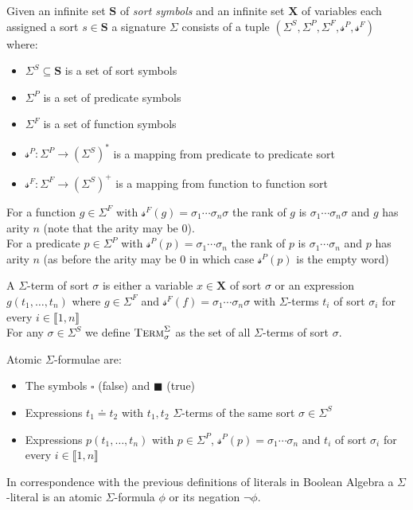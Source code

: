 \begin{definition}[Signature]
Given an infinite set $\mathbf{S}$ of \textit{sort symbols} and an infinite set $\mathbf{X}$ of variables each assigned a sort $s\in\mathbf{S}$ a signature $\Sigma$ consists of a tuple $\left(\Sigma^S, \Sigma^P, \Sigma^F, \mathcal{s}^P, \mathcal{s}^F \right)$ where:
\begin{itemize}
    \item $\Sigma^S \subseteq \mathbf{S}$ is a set of sort symbols
    \item $\Sigma^P$ is a set of predicate symbols
    \item $\Sigma^F$ is a set of function symbols
    \item $\mathcal{s}^P\colon \Sigma^P \to \left(\Sigma^S\right)^\ast$ is a mapping from predicate to predicate sort
    \item $\mathcal{s}^F\colon \Sigma^F \to \left(\Sigma^S\right)^+$ is a mapping from function to function sort
\end{itemize}
\end{definition}

\begin{definition}
For a function $g\in\Sigma^F$ with $\mathcal{s}^F(g)=\sigma_1\dotsi\sigma_n\sigma$ the rank of $g$ is $\sigma_1\dotsi\sigma_n\sigma$ and $g$ has arity $n$ (note that the arity may be $0$).\\
For a predicate $p\in\Sigma^P$ with $\mathcal{s}^P(p)=\sigma_1\dotsi\sigma_n$ the rank of $p$ is $\sigma_1\dotsi\sigma_n$ and $p$ has arity $n$ (as before the arity may be $0$ in which case $\mathcal{s}^P(p)$ is the empty word)
\end{definition}

\begin{definition}
A $\Sigma$-term of sort $\sigma$ is either a variable $x\in\mathbf{X}$ of sort $\sigma$ or an expression $g\left(t_1,\dots,t_n\right)$ where $g\in\Sigma^F$ and $\mathcal{s}^F(f)=\sigma_1\dotsi\sigma_n\sigma$ with $\Sigma$-terms $t_i$ of sort $\sigma_i$ for every $i\in\llbracket1,n\rrbracket$\\
For any $\sigma\in\Sigma^S$ we define $\textsc{Term}^\Sigma_\sigma$ as the set of all $\Sigma$-terms of sort $\sigma$.
\end{definition}

\begin{definition}
Atomic $\Sigma$-formulae are:
\begin{itemize}
    \item The symbols $\square$ (false) and $\blacksquare$ (true)
    \item Expressions $t_1 \doteq t_2$ with $t_1, t_2$ $\Sigma$-terms of the same sort $\sigma\in\Sigma^S$
    \item Expressions $p\left(t_1,\dots,t_n\right)$ with $p\in\Sigma^P$, $\mathcal{s}^P(p)=\sigma_1\dotsi\sigma_n$ and $t_i$ of sort $\sigma_i$ for every $i\in\llbracket1,n\rrbracket$
\end{itemize}
In correspondence with the previous definitions of literals in Boolean Algebra a $\Sigma$-literal is an atomic $\Sigma$-formula $\phi$ or its negation $\neg\phi$.
\end{definition}

